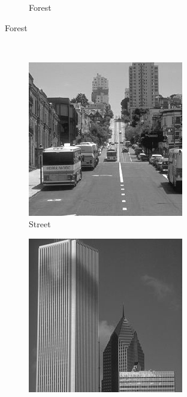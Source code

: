 \documentclass{report}
\begin{document}
\begin{figure}[H]
\begin{subfigure}[b]{0.17\textwidth}
\begin{subfigure}[b]{\textwidth}
        			\caption{Forest}
        		\end{subfigure}
        \end{subfigure}
        ~
        \begin{subfigure}[b]{0.17\textwidth}
        		\begin{subfigure}[b]{\textwidth}
                	\includegraphics[width=\textwidth]{graphics/street.png}
                	\caption{Street}
        		\end{subfigure}
        		\begin{subfigure}[b]{\textwidth}
        			\includegraphics[width=\textwidth]{graphics/tallbuilding.png}

\end{subfigure}
\end{subfigure}
\end{figure}
\end{document}
